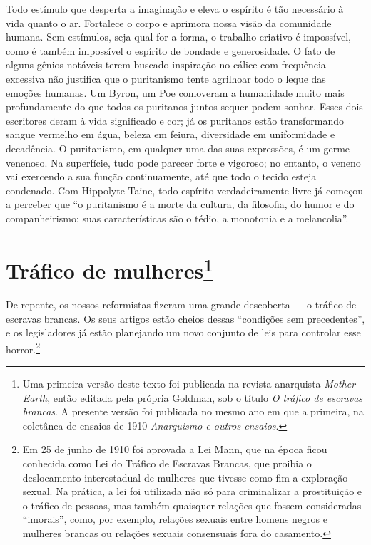 Todo estímulo que desperta a imaginação e eleva o espírito é tão
necessário à vida quanto o ar. Fortalece o corpo e aprimora nossa visão
da comunidade humana. Sem estímulos, seja qual for a forma, o trabalho
criativo é impossível, como é também impossível o espírito de bondade e
generosidade. O fato de alguns gênios notáveis terem buscado inspiração
no cálice com frequência excessiva não justifica que o puritanismo
tente agrilhoar todo o leque das emoções humanas. Um Byron, um Poe
comoveram a humanidade muito mais profundamente do que todos os
puritanos juntos sequer podem sonhar. Esses dois escritores deram à vida
significado e cor; já os puritanos estão transformando sangue vermelho
em água, beleza em feiura, diversidade em uniformidade e decadência. O
puritanismo, em qualquer uma das suas expressões, é um germe venenoso.
Na superfície, tudo pode parecer forte e vigoroso; no entanto, o veneno
vai exercendo a sua função continuamente, até que todo o tecido esteja
condenado. Com Hippolyte Taine, todo espírito verdadeiramente livre já
começou a perceber que ``o puritanismo é a morte da cultura, da
filosofia, do humor e do companheirismo; suas características são o
tédio, a monotonia e a melancolia''.

\chapter{Tráfico de mulheres\footnote[*]{Uma primeira versão deste texto foi
  publicada na revista anarquista \emph{Mother Earth}, então editada
  pela própria Goldman, sob o título \emph{O tráfico de escravas
  brancas}. A presente versão foi publicada no mesmo ano em que a
  primeira, na coletânea de ensaios de 1910 \emph{Anarquismo e outros
  ensaios}.}}

De repente, os nossos reformistas fizeram uma grande descoberta --- o
tráfico de escravas brancas. Os seus artigos estão cheios dessas
``condições sem precedentes'', e os legisladores já estão planejando um
novo conjunto de leis para controlar esse horror.\footnote{Em 25 de
  junho de 1910 foi aprovada a Lei Mann, que na época ficou conhecida
  como Lei do Tráfico de Escravas Brancas, que proibia o deslocamento
  interestadual de mulheres que tivesse como fim a exploração sexual. Na
  prática, a lei foi utilizada não só para criminalizar a prostituição e
  o tráfico de pessoas, mas também quaisquer relações que fossem
  consideradas ``imorais'', como, por exemplo, relações sexuais entre
  homens negros e mulheres brancas ou relações sexuais consensuais fora
  do casamento.}


